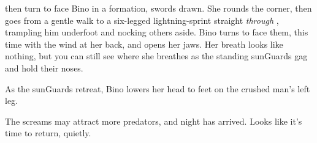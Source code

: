 then turn to face Bino in a formation, swords drawn.
She rounds the corner, then goes from a gentle walk to a six-legged lightning-sprint straight \emph{through} , trampling him underfoot and nocking others aside.
Bino turns to face them, this time with the wind at her back, and opens her jaws.
Her breath looks like nothing, but you can still see where she breathes as the standing \glspl{sunGuard} gag and hold their noses.

As the \glspl{sunGuard} retreat, Bino lowers her head to feet on the crushed man's left leg.

The screams may attract more predators, and night has arrived.
Looks like it's time to return, quietly.

\cyoaEnd
